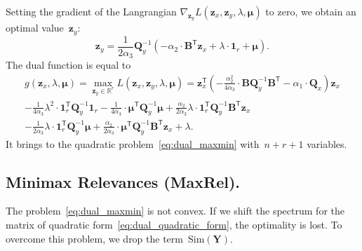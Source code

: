 \documentclass[12pt,oneside]{article}
\theoremstyle{definition}
\newcommand{\bz}{\mathbf{z}}
\newcommand{\bY}{\mathbf{Y}}
\newcommand{\bB}{\mathbf{B}}
\newcommand{\bQ}{\mathbf{Q}}
\newcommand{\bbR}{\mathbb{R}}
\newcommand{\T}{\mathsf{T}}
\newcommand{\bmu}{\boldsymbol{\mu}}
\newcommand{\bOne}{\boldsymbol{1}}
\begin{document}
Setting the gradient of the Langrangian $\nabla_{\bz_y} L(\bz_x, \bz_y, \lambda, \bmu)$ to zero, we obtain an optimal value~$\bz_y$:
\begin{equation}
	\bz_y = \frac{1}{2\alpha_3} \bQ_y^{-1} \left( - \alpha_2 \cdot \bB^{\T} \bz_x +\lambda \cdot \bOne_r + \bmu \right).
	\label{eq:ax}
\end{equation}
The dual function is equal to
\begin{multline}
	g(\bz_x, \lambda, \bmu)
	= \max_{\bz_y \in \bbR^r} L(\bz_x, \bz_y, \lambda, \bmu) =
	\bz_x^{\T} \left( - \frac{\alpha_2^2}{4\alpha_3} \cdot \bB \bQ_y^{-1} \bB^{\T} - \alpha_1 \cdot \bQ_x\right) \bz_x \\ - \frac{1}{4 \alpha_3} \lambda^2 \cdot \bOne_r^{\T} \bQ_y^{-1} \bOne_r - \frac{1}{4 \alpha_3} \cdot \bmu^{\T} \bQ_y^{-1} \bmu + \frac{\alpha_2}{2 \alpha_3} \lambda \cdot \bOne_r^{\T} \bQ_y^{-1} \bB^{\T} \bz_x \\ - \frac{1}{2 \alpha_3} \lambda \cdot \bOne_r^{\T} \bQ_y^{-1} \bmu + \frac{\alpha_2}{2 \alpha_3} \cdot \bmu^{\T} \bQ_y^{-1} \bB^{\T} \bz_x + \lambda.
	 \label{eq:dual_quadratic_form}
\end{multline}
It brings to the quadratic problem~\eqref{eq:dual_maxmin} with~$n + r + 1$ variables.

\subsection{Minimax Relevances (MaxRel).}

The problem~\eqref{eq:dual_maxmin} is not convex. If we shift the spectrum for the matrix of quadratic form~\eqref{eq:dual_quadratic_form}, the optimality is lost. To overcome this problem, we drop the term~$\text{Sim}(\bY)$.
\end{document}
